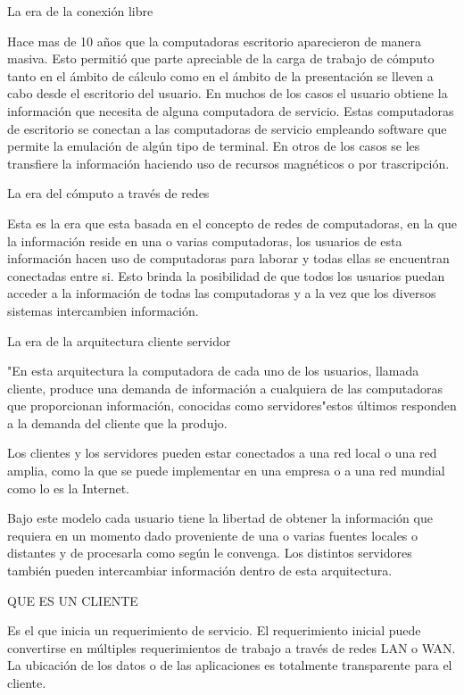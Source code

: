 La era de la conexión libre

Hace mas de 10 años que la computadoras escritorio aparecieron de manera masiva. Esto permitió que parte apreciable de la 
carga de trabajo de cómputo tanto en el ámbito de cálculo como en el ámbito de la presentación se lleven a cabo desde el 
escritorio del usuario. En muchos de los casos el usuario obtiene la información que necesita de alguna computadora de servicio. 
Estas computadoras de escritorio se conectan a las computadoras de servicio empleando software que permite la emulación de algún 
tipo de terminal. En otros de los casos se les transfiere la información haciendo uso de recursos magnéticos o por trascripción.

La era del cómputo a través de redes

Esta es la era que esta basada en el concepto de redes de computadoras, en la que la información reside en una o varias computadoras, 
los usuarios de esta información hacen uso de computadoras para laborar y todas ellas se encuentran conectadas entre si. Esto brinda 
la posibilidad de que todos los usuarios puedan acceder a la información de todas las computadoras y a la vez que los diversos sistemas
intercambien información.


La era de la arquitectura cliente servidor

"En esta arquitectura la computadora de cada uno de los usuarios, llamada cliente, produce una demanda de información a cualquiera de 
las computadoras que proporcionan información, conocidas como servidores"estos últimos responden a la demanda del cliente que la produjo.

Los clientes y los servidores pueden estar conectados a una red local o una red amplia, como la que se puede implementar en una empresa 
o a una red mundial como lo es la Internet.

Bajo este modelo cada usuario tiene la libertad de obtener la información que requiera en un momento dado proveniente de una o varias 
fuentes locales o distantes y de procesarla como según le convenga. Los distintos servidores también pueden intercambiar información 
dentro de esta arquitectura.



QUE ES UN CLIENTE

Es el que inicia un requerimiento de servicio. El requerimiento inicial puede convertirse en múltiples requerimientos de trabajo a 
través de redes LAN o WAN. La ubicación de los datos o de las aplicaciones es totalmente transparente para el cliente.

